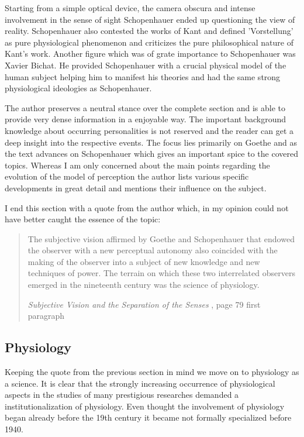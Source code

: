 \documentclass[12pt,a4paper]{article}
\begin{document}
Starting from a simple optical device, the camera obscura and intense involvement in the sense of sight
Schopenhauer ended up questioning the view of reality. Schopenhauer also contested the works of Kant
and defined 'Vorstellung' as pure physiological phenomenon and criticizes the pure philosophical nature
of Kant's work. Another figure which was of grate importance to Schopenhauer was Xavier Bichat.
He provided Schopenhauer with a crucial physical model of the human subject helping him to manifest
his theories and had the same strong physiological ideologies as Schopenhauer.

The author preserves a neutral stance over the complete section and is able to provide
very dense information in a enjoyable way. The important background knowledge about occurring
personalities is not reserved and the reader can get a deep insight into the respective events.
The focus lies primarily on Goethe and as the text advances on Schopenhauer which gives an important spice
to the covered topics. Whereas I am only concerned about the main points regarding the evolution of the
model of perception the author lists various specific developments in great detail and mentions their
influence on the subject.

I end this section with a quote from the author which, in my opinion could not have better caught
the essence of the topic:

\begin{quote}

The subjective vision affirmed by Goethe and Schopenhauer that endowed the observer with a new perceptual
autonomy also coincided with the making of the observer into a subject of new knowledge and new
techniques of power. The terrain on which these two interrelated observers emerged in the nineteenth
century was the science of physiology. 

{\it{Subjective Vision and the Separation of the Senses}} \cite{crary}, page 79 first paragraph

\end{quote}

\subsection*{Physiology}

Keeping the quote from the previous section in mind we move on to physiology as a science.
It is clear that the strongly increasing occurrence of physiological aspects in the studies of many
prestigious researches demanded a institutionalization of physiology. Even thought the involvement
of physiology began already before the 19th century it became not formally specialized before 1940.




\newpage



\end{document}
